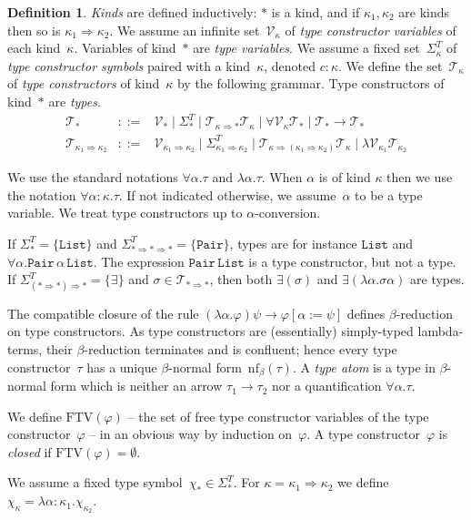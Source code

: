 \documentclass[a4paper,UKenglish,cleveref,autoref,numberwithinsect]{lipics-v2019}
\theoremstyle{definition}
\newtheorem{defn}[theorem]{Definition}
\newcommand{\arrkind}{\Rightarrow}
\newcommand{\arrtype}{\rightarrow}
\newcommand{\FTV}{\mathrm{FTV}}
\newcommand{\Tc}{\mathcal{T}}
\newcommand{\Vc}{\mathcal{V}}
\newcommand{\nf}{\mathrm{nf}}
\newcommand{\List}{\mathtt{List}}
\newcommand{\Pair}{\mathtt{Pair}}
\begin{document}
\begin{defn}\label{def_types}
  \emph{Kinds} are defined inductively: $*$ is a kind, and if
  $\kappa_1,\kappa_2$ are kinds then so is $\kappa_1 \arrkind
  \kappa_2$. We assume an infinite set~$\Vc_\kappa$ of \emph{type
    constructor variables} of each kind~$\kappa$. Variables of
  kind~$*$ are \emph{type variables}. We assume a fixed
  set~$\Sigma^T_\kappa$ of \emph{type constructor symbols} paired with a
  kind~$\kappa$, denoted $c : \kappa$.
  We define the set~$\Tc_\kappa$ of \emph{type constructors} of
  kind~$\kappa$ by the following grammar.
  Type constructors of kind~$*$ are \emph{types}.
  \[
  \begin{array}{rcl}
    \Tc_{*} &::=& \Vc_{*}
    \mid \Sigma^T_{*} \mid
    \Tc_{\kappa\arrkind *}\Tc_{\kappa} \mid \forall\Vc_\kappa\Tc_* \mid \Tc_*\arrtype\Tc_* \\
    \Tc_{\kappa_1\arrkind\kappa_2} &::=& \Vc_{\kappa_1\arrkind\kappa_2}
    \mid \Sigma^T_{\kappa_1\arrkind\kappa_2} \mid
    \Tc_{\kappa\arrkind(\kappa_1\arrkind\kappa_2)}\Tc_{\kappa} \mid \lambda \Vc_{\kappa_1} \Tc_{\kappa_2}
  \end{array}
  \]

  We use the standard notations $\forall \alpha . \tau$ and $\lambda
  \alpha . \tau$. When $\alpha$ is of kind $\kappa$ then we use the
  notation $\forall \alpha : \kappa . \tau$. If not indicated
  otherwise, we assume~$\alpha$ to be a type variable. We treat type
  constructors up to $\alpha$-conversion.

  \begin{example}
  If $\Sigma^T_{*} = \{ \List \}$ and $\Sigma^T_{* \arrkind * \arrkind
  *} = \{ \Pair \}$, types are for instance $\List$ and
  $\forall \alpha.\Pair\,\alpha\,\List$.  The expression
  $\Pair\,\List$ is a type constructor, but not a type.  If
  $\Sigma^T_{(* \arrkind *) \arrkind *} = \{ \exists \}$ and
  $\sigma \in \Tc_{* \arrkind *}$, then both
  $\exists(\sigma)$ and $\exists (\lambda \alpha.\sigma\alpha)$ are
  types.
  \end{example}

  The compatible closure of the rule $(\lambda\alpha.\varphi)\psi \to
  \varphi[\alpha := \psi]$ defines $\beta$-reduction on type
  constructors. As type constructors are (essentially) simply-typed
  lambda-terms, their $\beta$-reduction terminates
  and is confluent; hence every type constructor~$\tau$ has a unique
  $\beta$-normal form~$\nf_\beta(\tau)$. A \emph{type atom} is a type
  in $\beta$-normal form which is neither an arrow $\tau_1\arrtype\tau_2$
  nor a quantification $\forall\alpha.\tau$.

  We define $\FTV(\varphi)$ -- the set of free type constructor
  variables of the type constructor~$\varphi$ -- in an obvious way by
  induction on~$\varphi$. A type constructor~$\varphi$ is
  \emph{closed} if $\FTV(\varphi) = \emptyset$.

  We assume a fixed type symbol~$\chi_* \in
  \Sigma^T_*$. For $\kappa=\kappa_1\arrkind\kappa_2$ we define
  $\chi_\kappa = \lambda \alpha:\kappa_1 . \chi_{\kappa_2}$.
\end{defn}
\end{document}
